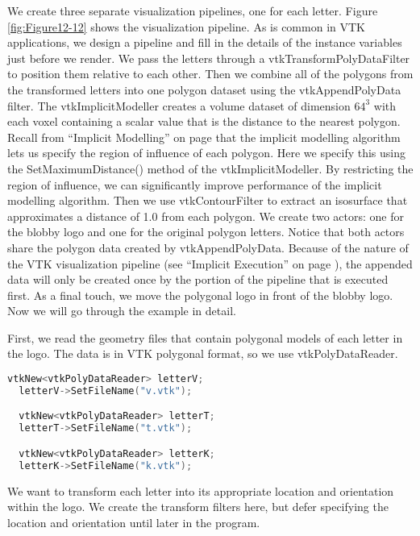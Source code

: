 We create three separate visualization pipelines, one for each letter. Figure \ref{fig:Figure12-12} shows the visualization pipeline. As is common in VTK applications, we design a pipeline and fill in the details of the instance variables just before we render. We pass the letters through a vtkTransformPolyDataFilter to position them relative to each other. Then we combine all of the polygons from the transformed letters into one polygon dataset using the vtkAppendPolyData filter. The vtkImplicitModeller creates a volume dataset of dimension $64^3$ with each voxel containing a scalar value that is the distance to the nearest polygon. Recall from ``Implicit Modelling'' on page \pageref{subsec:implicit_modelling} that the implicit modelling algorithm lets us specify the region of influence of each polygon. Here we specify this using the SetMaximumDistance() method of the vtkImplicitModeller. By restricting the region of influence, we can significantly improve performance of the implicit modelling algorithm. Then we use vtkContourFilter to extract an isosurface that approximates a distance of 1.0 from each polygon. We create two actors: one for the blobby logo and one for the original polygon letters. Notice that both actors share the polygon data created by vtkAppendPolyData. Because of the nature of the VTK visualization pipeline (see ``Implicit Execution'' on page \pageref{subsec:implicit_execution} ), the appended data will only be created once by the portion of the pipeline that is executed first. As a final touch, we move the polygonal logo in front of the blobby logo. Now we will go through the example in detail.

First, we read the geometry files that contain polygonal models of each letter in the logo. The data is in VTK polygonal format, so we use vtkPolyDataReader.

\begin{lstlisting}[language=C++, caption={Reading the polygonal models of each letter.}]
  vtkNew<vtkPolyDataReader> letterV;
  letterV->SetFileName("v.vtk");

  vtkNew<vtkPolyDataReader> letterT;
  letterT->SetFileName("t.vtk");

  vtkNew<vtkPolyDataReader> letterK;
  letterK->SetFileName("k.vtk");
\end{lstlisting}

\noindent We want to transform each letter into its appropriate location and orientation within the logo. We create the transform filters here, but defer specifying the location and orientation until later in the program.

